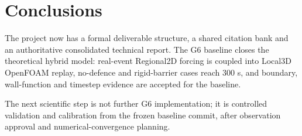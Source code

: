 \section{Conclusions}

The project now has a formal deliverable structure, a shared citation bank and an authoritative consolidated technical report. The G6 baseline closes the theoretical hybrid model: real-event Regional2D forcing is coupled into Local3D OpenFOAM replay, no-defence and rigid-barrier cases reach 300 s, and boundary, wall-function and timestep evidence are accepted for the baseline.

The next scientific step is not further G6 implementation; it is controlled validation and calibration from the frozen baseline commit, after observation approval and numerical-convergence planning.
